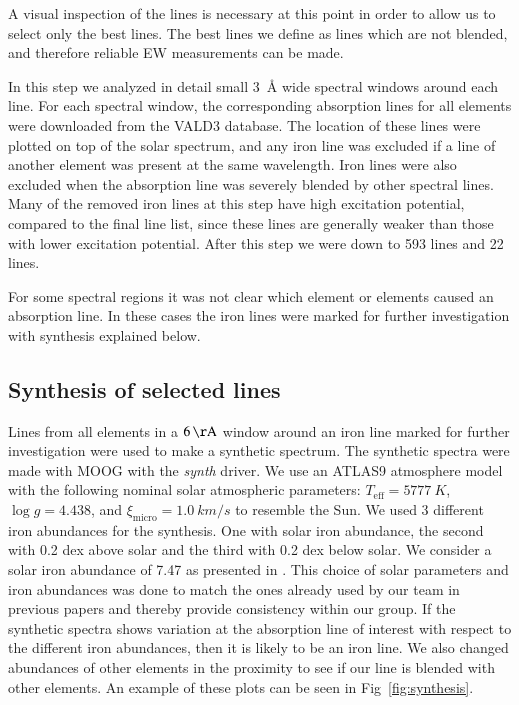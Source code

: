 \documentclass{aa}
\begin{document}
A visual inspection of the lines is necessary at this point in order
to allow us to select only the best lines. The best lines we define as
lines which are not blended, and therefore reliable EW measurements can
be made.

In this step we analyzed in detail small \SI{3}{\angstrom} wide spectral
windows around each line. For each spectral window, the corresponding
absorption lines for all elements were downloaded from the VALD3
database. The location of these lines were plotted on top of the solar
spectrum, and any iron line was excluded if a line of another element was
present at the same wavelength. Iron lines were also excluded when
the absorption line was severely blended by other spectral lines. Many
of the removed iron lines at this step have high excitation potential,
compared to the final line list, since these lines are generally weaker
than those with lower excitation potential. After this step we were down
to 593  lines and 22  lines.

For some spectral regions it was not clear which element or elements
caused an absorption line. In these cases the iron lines were marked for
further investigation with synthesis explained below.


\subsection{Synthesis of selected lines}
\label{sub:synthesis_of_selected_lines}

Lines from all elements in a $\SI{6}{\AA}$ window around an iron line
marked for further investigation were used to make a synthetic spectrum.
The synthetic spectra were made with MOOG with the \emph{synth} driver. We use
an ATLAS9 atmosphere model \citep{Kurucz1993} with the following nominal
solar atmospheric parameters: $T_\mathrm{eff}=\SI{5777}{K}$, $\log g =
4.438$, and $\xi_\mathrm{micro} = \SI{1.0}{km/s}$ to resemble the Sun.
We used 3 different iron abundances for the synthesis. One with solar
iron abundance, the second with 0.2 dex above solar and the third with
0.2 dex below solar. We consider a solar iron abundance of 7.47 as
presented in \cite{Gonzalez2000}. This choice of solar parameters
and iron abundances was done to match the ones already used by our team
in previous papers \citep[see e.g.][and references therein]{Santos13}
and thereby provide consistency within our group.
If the synthetic spectra shows variation at the absorption line of
interest with respect to the different iron abundances, then it is
likely to be an iron line. We also changed abundances of other elements
in the proximity to see if our line is blended with other elements. An
example of these plots can be seen in Fig~\ref{fig:synthesis}.
\end{document}
